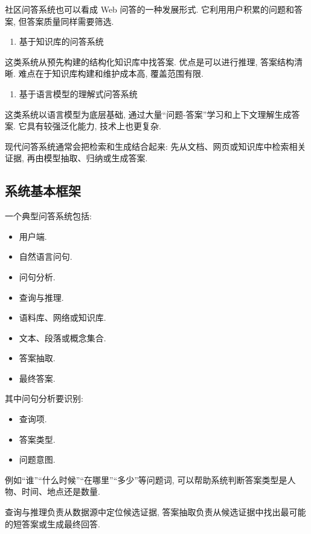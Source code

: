 社区问答系统也可以看成 Web 问答的一种发展形式.
它利用用户积累的问题和答案, 但答案质量同样需要筛选.

\begin{enumerate}
\item[3.] 基于知识库的问答系统
\end{enumerate}

这类系统从预先构建的结构化知识库中找答案.
优点是可以进行推理, 答案结构清晰.
难点在于知识库构建和维护成本高, 覆盖范围有限.

\begin{enumerate}
\item[4.] 基于语言模型的理解式问答系统
\end{enumerate}

这类系统以语言模型为底层基础,
通过大量“问题-答案”学习和上下文理解生成答案.
它具有较强泛化能力, 技术上也更复杂.

现代问答系统通常会把检索和生成结合起来:
先从文档、网页或知识库中检索相关证据, 再由模型抽取、归纳或生成答案.

\subsection{系统基本框架}


一个典型问答系统包括:

\begin{itemize}
\item 用户端.
\item 自然语言问句.
\item 问句分析.
\item 查询与推理.
\item 语料库、网络或知识库.
\item 文本、段落或概念集合.
\item 答案抽取.
\item 最终答案.
\end{itemize}

其中问句分析要识别:

\begin{itemize}
\item 查询项.
\item 答案类型.
\item 问题意图.
\end{itemize}

例如“谁”“什么时候”“在哪里”“多少”等问题词,
可以帮助系统判断答案类型是人物、时间、地点还是数量.

查询与推理负责从数据源中定位候选证据,
答案抽取负责从候选证据中找出最可能的短答案或生成最终回答.

